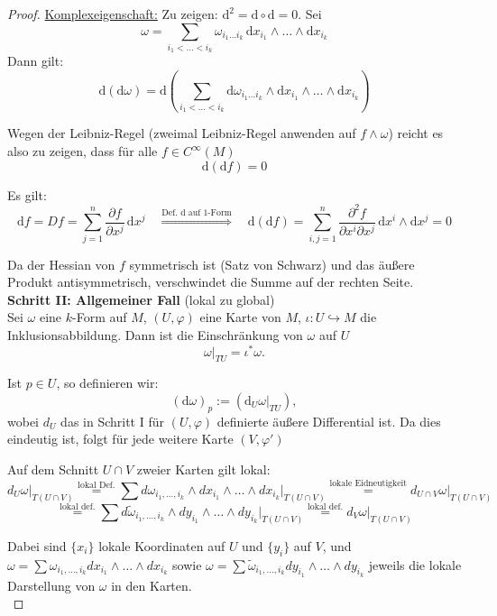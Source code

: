 \documentclass[fleqn, 12pt, letterpaper]{article}
\newcommand{\txt}[1]{\text{#1}}
\begin{document}
\begin{proof}
\underline{Komplexeigenschaft:}
Zu zeigen: \( \mathrm{d}^2 = \mathrm{d} \circ \mathrm{d} = 0 \). Sei 
\[
\omega = \sum_{i_1 < \dots < i_k} \omega_{i_1 \dots i_k} \, \mathrm{d}x_{i_1} \wedge \dots \wedge \mathrm{d}x_{i_k}
\]
Dann gilt:
\[
\mathrm{d}(\mathrm{d}\omega) = \mathrm{d}\left( \sum_{i_1 < \dots < i_k} \mathrm{d} \omega_{i_1 \dots i_k} \wedge \mathrm{d}x_{i_1} \wedge \dots \wedge \mathrm{d}x_{i_k} \right)
\]

Wegen der Leibniz-Regel (zweimal Leibniz-Regel anwenden auf $f\wedge \omega$) reicht es also zu zeigen, dass für alle \( f \in C^\infty(M) \)
\[
\mathrm{d}(\mathrm{d}f) = 0
\]

Es gilt:
\[
\mathrm{d}f = Df = \sum_{j=1}^n \frac{\partial f}{\partial x^j} \, \mathrm{d}x^j
\quad \overset{\txt{Def. d auf 1-Form}}{\Rightarrow} \quad
\mathrm{d}(\mathrm{d}f) = \sum_{i,j=1}^n \frac{\partial^2 f}{\partial x^i \partial x^j} \, \mathrm{d}x^i \wedge \mathrm{d}x^j = 0
\]

Da der Hessian von \( f \) symmetrisch ist (Satz von Schwarz) und das äußere Produkt antisymmetrisch, verschwindet die Summe auf der rechten Seite.\\

\textbf{Schritt II: Allgemeiner Fall} (lokal zu global)\\
Sei \( \omega \) eine \( k \)-Form auf \( M \), \( (U, \varphi) \) eine Karte von \( M \), \( \iota: U \hookrightarrow M \) die Inklusionsabbildung. Dann ist die Einschränkung von \( \omega \) auf \( U \)
\[
\omega|_{TU} = \iota^* \omega.
\]

Ist \( p \in U \), so definieren wir:
\[
(\mathrm{d}\omega)_p := (\mathrm{d}_U\omega|_{TU}),
\]
wobei $d_U$ das in Schritt I für \( (U, \varphi) \) definierte äußere Differential ist. Da dies eindeutig ist, folgt für jede weitere Karte \( (V, \varphi') \)

Auf dem Schnitt \( U \cap V \) zweier Karten gilt lokal:
\[
\left. d_U \omega \right|_{T(U \cap V)}
\overset{\txt{lokal Def.}}{=} \sum d\omega_{i_1, \dots, i_k} \wedge dx_{i_1} \wedge \dots \wedge dx_{i_k}
\Big|_{T(U \cap V)} \overset{\txt{lokale Eidneutigkeit}}{=} \left. d_{U \cap V} \omega \right|_{T(U \cap V)}
\]
\[
\overset{\txt{lokal def.}}{=} \sum d\tilde{\omega}_{i_1, \dots, i_k} \wedge dy_{i_1} \wedge \dots \wedge dy_{i_k}
\Big|_{T(U \cap V)}
\overset{\txt{lokal def.}}{=} \left. d_V \omega \right|_{T(U \cap V)}
\]

Dabei sind \( \{x_i\} \) lokale Koordinaten auf \( U \) und \( \{y_i\} \) auf \( V \), und \( \omega = \sum \omega_{i_1, \dots, i_k} dx_{i_1} \wedge \dots \wedge dx_{i_k} \) sowie \( \omega = \sum \tilde{\omega}_{i_1, \dots, i_k} dy_{i_1} \wedge \dots \wedge dy_{i_k} \) jeweils die lokale Darstellung von \( \omega \) in den Karten.\\



\end{proof}
\end{document}
